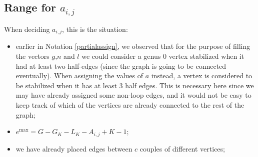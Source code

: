 \documentclass{amsart}
\theoremstyle{plain}
\theoremstyle{definition}
\DeclareMathOperator{\MAX}{max}
\begin{document}
\subsection{Range for $a_{i,j}$}

When deciding $a_{i,j}$, this is the situation:
\begin{itemize}
\item earlier in Notation \ref{partialassign}, we observed that for the
	purpose of filling the vectors $g$,$n$ and $l$ we could consider a genus $0$
	vertex stabilized when it had at least two half-edges (since the graph
	is going to be connected eventually). When assigning the values of $a$ instead,
	a vertex is considered to be stabilized when it has at least $3$ half edges. 
	This is necessary here since we may have already assigned some
  non-loop edges, and it would not be easy to keep track of which of the 
  vertices are already connected to the rest of the graph;
\item $e^{\MAX} = G - G_K - L_K - A_{i,j} + K - 1$;
\item we have already placed edges between $c$ couples of different
  vertices;
\end{itemize}
\end{document}
